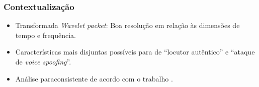 \begin{frame}
	\frametitle{Contextualização}
	\begin{itemize}
		\item Transformada \textit{Wavelet packet}: Boa resolução em relação às dimensões de tempo e frequência.
		\item Características mais disjuntas possíveis para de ``locutor autêntico'' e ``ataque de \textit{voice spoofing}''.
		\item Análise paraconsistente de acordo com o trabalho \cite{8588433}.
	\end{itemize}
\end{frame}